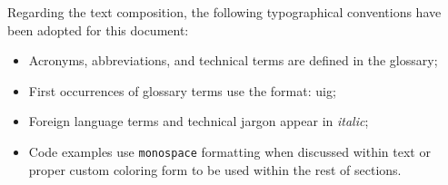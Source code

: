 Regarding the text composition, the following typographical conventions have been adopted for this document:
\begin{itemize}
    \item Acronyms, abbreviations, and technical terms are defined in the glossary;
    \item First occurrences of glossary terms use the format: \gls{uig};
    \item Foreign language terms and technical jargon appear in \textit{italic};
    \item Code examples use \texttt{monospace} formatting when discussed within text or proper custom coloring form to be used within the rest of sections.
\end{itemize}

\newpage